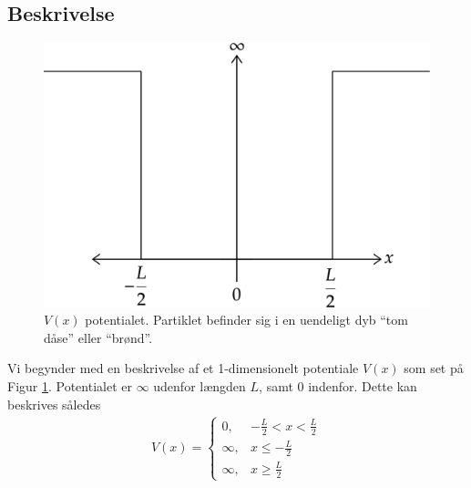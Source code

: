 \documentclass[12pt]{article}
\theoremstyle{definition}
\theoremstyle{remark}
\theoremstyle{definition}
\numberwithin{equation}{section}
\begin{document}
\subsection{Beskrivelse}
\begin{figure}[!h]
    \centering
    \includegraphics[scale=0.16]{diagram-20201209.png}
    \caption{$V(x)$ potentialet. Partiklet befinder sig i en uendeligt dyb ``tom dåse'' eller ``brønd''.}
    \label{fig:pot1}
\end{figure}
Vi begynder med en beskrivelse af et 1-dimensionelt potentiale $V(x)$ som set på Figur \ref{fig:pot1}. Potentialet er $\infty$ udenfor længden $L$, samt 0 indenfor. Dette kan beskrives således
\begin{align}
    V(x) = \begin{cases}
    0, & -\frac{L}{2} < x < \frac{L}{2} \\
    \infty, & x \leq -\frac{L}{2} \\
    \infty, & x \geq \frac{L}{2}
    \end{cases}
\end{align}
\end{document}
